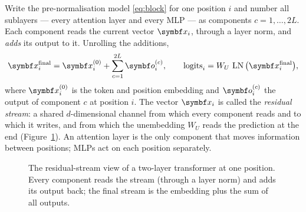 \documentclass[11pt]{article}
\newcommand{\LN}{\operatorname{LN}}
\begin{document}
Write the pre-normalisation model \eqref{eq:block} for one position $i$ and number all sublayers --- every attention layer
and every MLP --- as components $c = 1, \dots, 2L$. Each component reads the current vector $\x_i$, through a layer norm,
and \emph{adds} its output to it. Unrolling the additions,
\begin{equation}\label{eq:stream}
  \x_i^{\mathrm{final}} = \x_i^{(0)} + \sum_{c=1}^{2L}\vect{o}_i^{(c)}, \qquad
  \text{logits}_i = W_U\,\LN\big(\x_i^{\mathrm{final}}\big),
\end{equation}
where $\x_i^{(0)}$ is the token and position embedding and $\vect{o}_i^{(c)}$ the output of component $c$ at position $i$. The
vector $\x_i$ is called the \emph{residual stream}: a shared $d$-dimensional channel from which every component reads and to
which it writes, and from which the unembedding $W_U$ reads the prediction at the end (Figure~\ref{fig:stream}). An
attention layer is the only component that moves information between positions; MLPs act on each position separately.

\begin{figure}[htbp]
\centering
{}
\caption{The residual-stream view of a two-layer transformer at one position. Every component reads the stream (through a
layer norm) and adds its output back; the final stream is the embedding plus the sum of all outputs.}
\label{fig:stream}
\end{figure}
\end{document}
